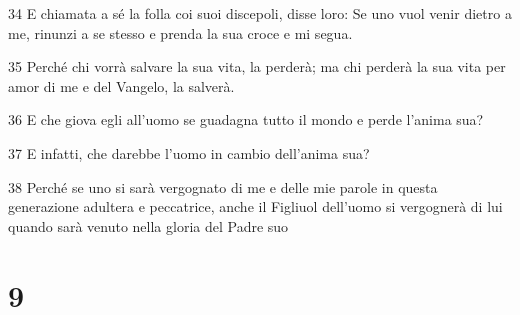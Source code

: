 \par 34 E chiamata a sé la folla coi suoi discepoli, disse loro: Se uno vuol venir dietro a me, rinunzi a se stesso e prenda la sua croce e mi segua.
\par 35 Perché chi vorrà salvare la sua vita, la perderà; ma chi perderà la sua vita per amor di me e del Vangelo, la salverà.
\par 36 E che giova egli all'uomo se guadagna tutto il mondo e perde l'anima sua?
\par 37 E infatti, che darebbe l'uomo in cambio dell'anima sua?
\par 38 Perché se uno si sarà vergognato di me e delle mie parole in questa generazione adultera e peccatrice, anche il Figliuol dell'uomo si vergognerà di lui quando sarà venuto nella gloria del Padre suo

\chapter{9}

